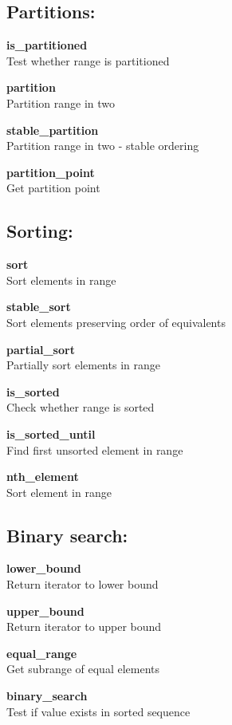 \documentclass[table]{article}
\begin{document}
\begin{multicols}{2}
	\subsection*{Partitions:}
	
	\textbf{is\_partitioned}\\
	Test whether range is partitioned
	
	\textbf{partition}\\
	Partition range in two
	
	\textbf{stable\_partition}\\
	Partition range in two - stable ordering
	
	\textbf{partition\_point}\\
	Get partition point
	
	\subsection*{Sorting:}
	
	\textbf{sort}\\
	Sort elements in range
	
	\textbf{stable\_sort}\\
	Sort elements preserving order of equivalents
	
	\textbf{partial\_sort}\\
	Partially sort elements in range
	
	\textbf{is\_sorted}\\
	Check whether range is sorted
	
	\textbf{is\_sorted\_until}\\
	Find first unsorted element in range
	
	\textbf{nth\_element}\\
	Sort element in range
	
	\subsection*{Binary search:}
	
	\textbf{lower\_bound}\\
	Return iterator to lower bound
	
	\textbf{upper\_bound}\\
	Return iterator to upper bound
	
	\textbf{equal\_range}\\
	Get subrange of equal elements
	
	\textbf{binary\_search}\\
	Test if value exists in sorted sequence
	

\end{multicols}
\end{document}
